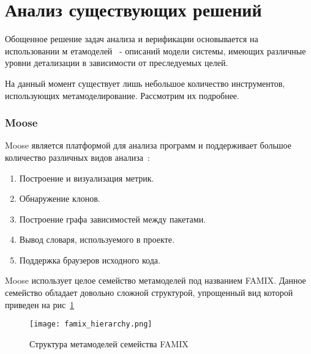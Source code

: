 \section{Анализ существующих решений}

Обощенное решение задач анализа и верификации основывается на использовании м
етамоделей~\cite{metamodeling} - описаний модели системы, имеющих различные
уровни детализации в зависимости от преследуемых целей.

На данный момент существует лишь небольшое количество инструментов, использующих
метамоделирование. Рассмотрим их подробнее.

\subsubsection{Moose}

Moose является платформой для анализа программ и поддерживает большое количество
различных видов анализа~\cite{moose}:

\begin{enumerate}
    \item Построение и визуализация метрик.
    \item Обнаружение клонов.
    \item Построение графа зависимостей между пакетами.
    \item Вывод словаря, используемого в проекте.
    \item Поддержка браузеров исходного кода.
\end{enumerate}


Moose использует целое семейство метамоделей под названием FAMIX. Данное
семейство обладает довольно сложной структурой, упрощенный вид которой приведен
на рис~\ref{fig:famix_hierarchy}

\newpage
\begin{figure}[h!]
     \begin{center}
         \texttt{[image: famix\_hierarchy.png]}
     \end{center}
     \caption{Структура метамоделей семейства FAMIX}
     \label{fig:famix_hierarchy}
\end{figure}
\newpage

